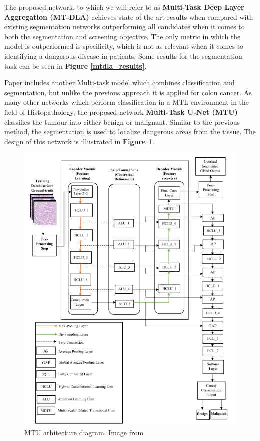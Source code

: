 The proposed network, to which we will refer to as \textbf{Multi-Task Deep Layer Aggregation (MT-DLA)} achieves state-of-the-art results when compared with existing segmentation networks outperforming all candidates when it comes to both the segmentation and screening objective. The only metric in which the model is outperformed is specificity, which is not as relevant when it comes to identifying a dangerous disease in patients. Some results for the segmentation task can be seen in \textbf{Figure \ref{mtdla_results}}.

Paper \cite{dabass2022mtu} includes another Multi-task model which combines classification and segmentation, but unlike the previous approach it is applied for colon cancer. As many other networks which perform classification in a MTL environment in the field of Histopathology, the proposed network \textbf{Multi-Task U-Net (MTU)} classifies the tumour into either benign or malignant. Similar to the previous method, the segmentation is used to localize dangerous areas from the tissue. The design of this network is illustrated in \textbf{Figure \ref{mtu}}.

\begin{figure}[htb]
    \centering
	\centerline{\includegraphics[scale=0.8]{figures/mtu.png}}
	\caption{MTU arhitecture diagram. Image from \cite{dabass2022mtu}}
	\label{mtu}
\end{figure}


